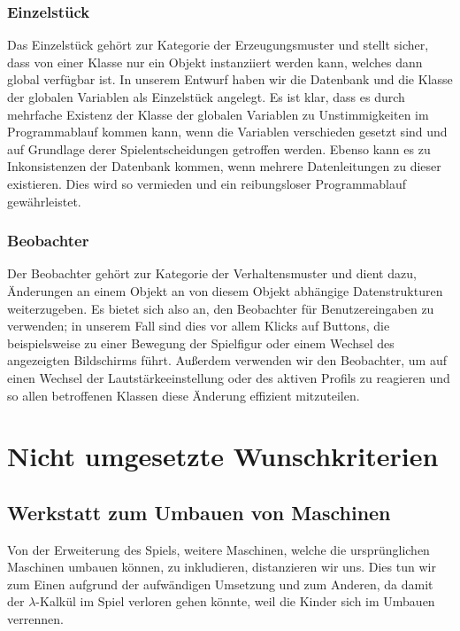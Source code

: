 \documentclass[11pt,a4paper]{report}
\begin{document}
\subsection{Einzelstück}
Das Einzelstück gehört zur Kategorie der Erzeugungsmuster und stellt sicher, dass von einer Klasse nur ein Objekt instanziiert werden kann, welches dann global verfügbar ist. In unserem Entwurf haben wir die Datenbank und die Klasse der globalen Variablen als Einzelstück angelegt. Es ist klar, dass es durch mehrfache Existenz der Klasse der globalen Variablen zu Unstimmigkeiten im Programmablauf kommen kann, wenn die Variablen verschieden gesetzt sind und auf Grundlage derer Spielentscheidungen getroffen werden. Ebenso kann es zu Inkonsistenzen der Datenbank kommen, wenn mehrere Datenleitungen zu dieser existieren. Dies wird so vermieden und ein reibungsloser Programmablauf gewährleistet.

\subsection{Beobachter}
Der Beobachter gehört zur Kategorie der Verhaltensmuster und dient dazu, Änderungen an einem Objekt an von diesem Objekt abhängige Datenstrukturen weiterzugeben. Es bietet sich also an, den Beobachter für Benutzereingaben zu verwenden; in unserem Fall sind dies vor allem Klicks auf Buttons, die beispielsweise zu einer Bewegung der Spielfigur oder einem Wechsel des angezeigten Bildschirms führt. Außerdem verwenden wir den Beobachter, um auf einen Wechsel der Lautstärkeeinstellung oder des aktiven Profils zu reagieren und so allen betroffenen Klassen diese Änderung effizient mitzuteilen.

\clearpage

\chapter{Nicht umgesetzte Wunschkriterien}

\section{Werkstatt zum Umbauen von Maschinen}

Von der Erweiterung des Spiels, weitere Maschinen, welche die ursprünglichen Maschinen umbauen können, zu inkludieren, distanzieren wir uns. Dies tun wir zum Einen aufgrund der aufwändigen Umsetzung und zum Anderen, da damit der $\lambda$-Kalkül im Spiel verloren gehen könnte, weil die Kinder sich im Umbauen verrennen.
\end{document}
